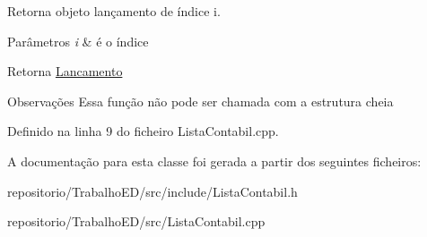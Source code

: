 Retorna objeto lançamento de índice i. 


\begin{DoxyParams}{Parâmetros}
{\em i} & é o índice\\
\hline
\end{DoxyParams}
\begin{DoxyReturn}{Retorna}
\hyperlink{classLancamento}{Lancamento}
\end{DoxyReturn}
\begin{DoxyRemark}{Observações}
Essa função não pode ser chamada com a estrutura cheia 
\end{DoxyRemark}


Definido na linha 9 do ficheiro Lista\-Contabil.\-cpp.



A documentação para esta classe foi gerada a partir dos seguintes ficheiros\-:\begin{DoxyCompactItemize}
\item 
repositorio/\-Trabalho\-E\-D/src/include/Lista\-Contabil.\-h\item 
repositorio/\-Trabalho\-E\-D/src/Lista\-Contabil.\-cpp\end{DoxyCompactItemize}

